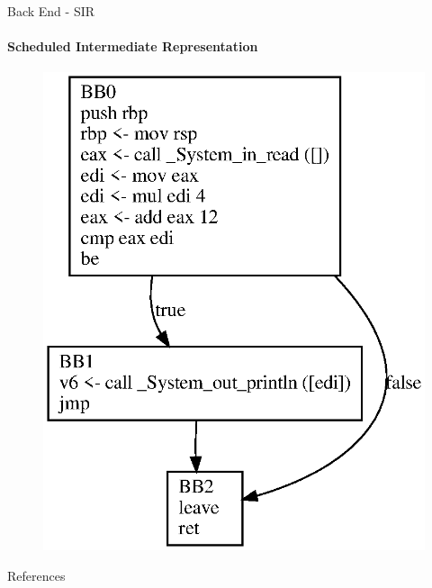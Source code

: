 \documentclass[en,16:9]{sdqbeamer}
\begin{document}
\begin{frame}{Back End - SIR}
	\framesubtitle{Scheduled Intermediate Representation}
	
	\begin{figure}
		\centering
		\includegraphics[scale=0.5]{images/sir-after-reg-alloc}
	\end{figure}
	
\end{frame}

\appendix
\beginbackup

\begin{frame}{References}
\printbibliography
\end{frame}


\backupend
\end{document}
